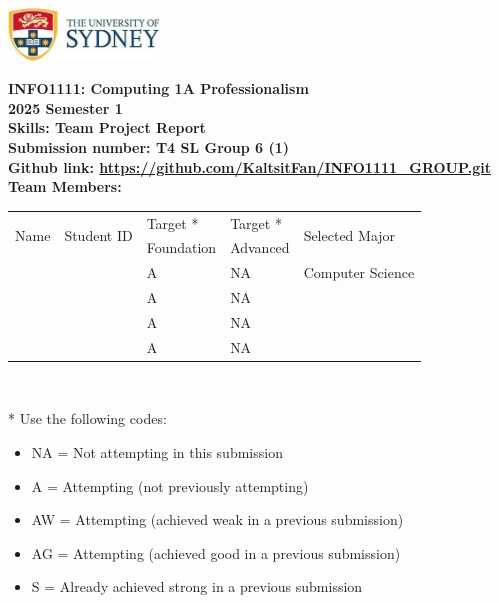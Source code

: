 \documentclass[a4paper, 11pt]{report}
\begin{document}
\begin{titlepage}
\begin{flushright}
\includegraphics[width=4cm]{USyd}\\[1cm]
\end{flushright}

\begin{centering}
\textbf{\huge INFO1111: Computing 1A Professionalism}\\[0.75cm]
\textbf{\huge 2025 Semester 1}\\[2cm]
\textbf{\huge Skills: Team Project Report}\\[2cm]

\textbf{\large Submission number: T4 SL Group 6 (1)}\\[0.5cm]
{\large \textbf{Github link: \url{https://github.com/KaltsitFan/INFO1111_GROUP.git}}}\\[0.75cm]
\textbf{\huge Team Members:}\\[0.75cm]

\begin{tabular}{|p{}|p{}|p{}|p{}|p{}|}
	\hline
	\multirow{2}{*}{Name} & \multirow{2}{*}{Student ID} & Target * & Target * & \multirow{2}{*}{Selected Major} \\
	 & & Foundation & Advanced & \\
	\hline
	\hline
	\raggedright{\studA} & \sidA & A & NA & Computer Science \\
	\hline
	\raggedright{\studB} & \sidB & A & NA & \majB \\
	\hline
	\raggedright{\studC} & \sidC & A & NA & \majC \\
	\hline
	\raggedright{\studD} & \sidD & A & NA & \majD \\
	\hline
\end{tabular}
\\[0.5cm]
\end{centering}

* Use the following codes:
\begin{itemize}
\setlength\itemsep{0em}
\item NA = Not attempting in this submission
\item A = Attempting (not previously attempting)
\item AW = Attempting (achieved weak in a previous submission) 
\item AG = Attempting (achieved good in a previous submission)
\item S = Already achieved strong in a previous submission
\end{itemize}

\thispagestyle{empty}
\end{titlepage}
\end{document}
